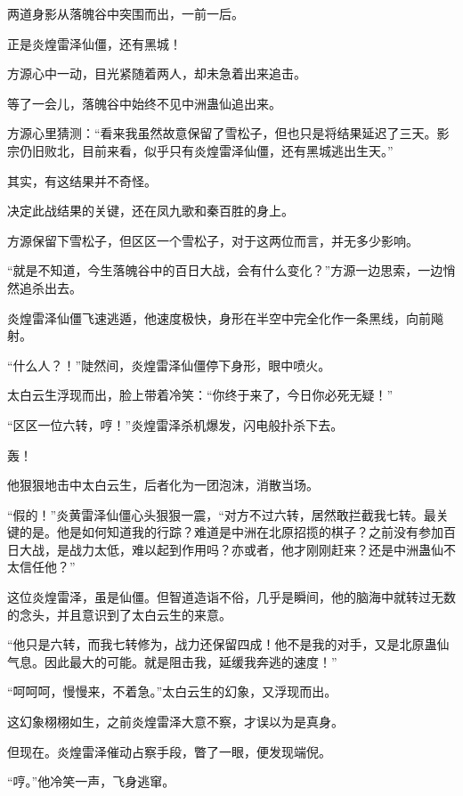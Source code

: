 
\begin{this_body}

两道身影从落魄谷中突围而出，一前一后。

正是炎煌雷泽仙僵，还有黑城！

方源心中一动，目光紧随着两人，却未急着出来追击。

等了一会儿，落魄谷中始终不见中洲蛊仙追出来。

方源心里猜测：“看来我虽然故意保留了雪松子，但也只是将结果延迟了三天。影宗仍旧败北，目前来看，似乎只有炎煌雷泽仙僵，还有黑城逃出生天。”

其实，有这结果并不奇怪。

决定此战结果的关键，还在凤九歌和秦百胜的身上。

方源保留下雪松子，但区区一个雪松子，对于这两位而言，并无多少影响。

“就是不知道，今生落魄谷中的百日大战，会有什么变化？”方源一边思索，一边悄然追杀出去。

炎煌雷泽仙僵飞速逃遁，他速度极快，身形在半空中完全化作一条黑线，向前飚射。

“什么人？！”陡然间，炎煌雷泽仙僵停下身形，眼中喷火。

太白云生浮现而出，脸上带着冷笑：“你终于来了，今日你必死无疑！”

“区区一位六转，哼！”炎煌雷泽杀机爆发，闪电般扑杀下去。

轰！

他狠狠地击中太白云生，后者化为一团泡沫，消散当场。

“假的！”炎黄雷泽仙僵心头狠狠一震，“对方不过六转，居然敢拦截我七转。最关键的是。他是如何知道我的行踪？难道是中洲在北原招揽的棋子？之前没有参加百日大战，是战力太低，难以起到作用吗？亦或者，他才刚刚赶来？还是中洲蛊仙不太信任他？”

这位炎煌雷泽，虽是仙僵。但智道造诣不俗，几乎是瞬间，他的脑海中就转过无数的念头，并且意识到了太白云生的来意。

“他只是六转，而我七转修为，战力还保留四成！他不是我的对手，又是北原蛊仙气息。因此最大的可能。就是阻击我，延缓我奔逃的速度！”

“呵呵呵，慢慢来，不着急。”太白云生的幻象，又浮现而出。

这幻象栩栩如生，之前炎煌雷泽大意不察，才误以为是真身。

但现在。炎煌雷泽催动占察手段，瞥了一眼，便发现端倪。

“哼。”他冷笑一声，飞身逃窜。


\end{this_body}
